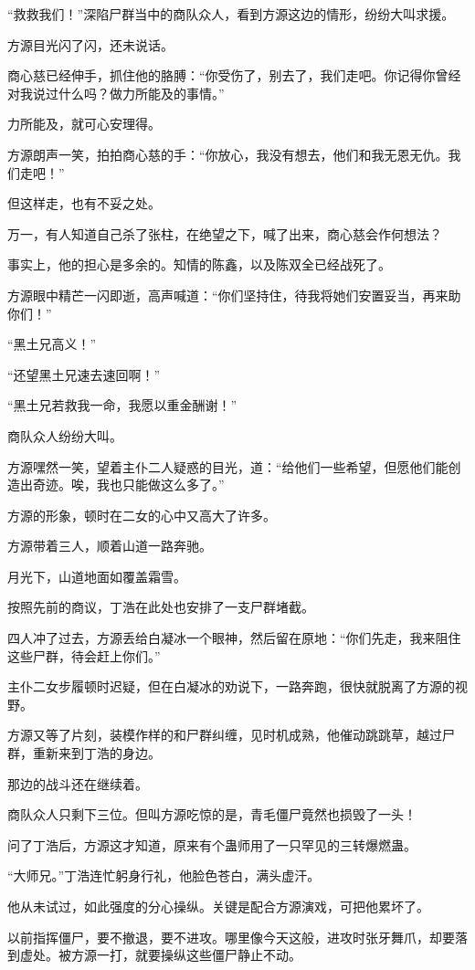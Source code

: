 \begin{this_body}
“救救我们！”深陷尸群当中的商队众人，看到方源这边的情形，纷纷大叫求援。

方源目光闪了闪，还未说话。

商心慈已经伸手，抓住他的胳膊：“你受伤了，别去了，我们走吧。你记得你曾经对我说过什么吗？做力所能及的事情。”

力所能及，就可心安理得。

方源朗声一笑，拍拍商心慈的手：“你放心，我没有想去，他们和我无恩无仇。我们走吧！”

但这样走，也有不妥之处。

万一，有人知道自己杀了张柱，在绝望之下，喊了出来，商心慈会作何想法？

事实上，他的担心是多余的。知情的陈鑫，以及陈双全已经战死了。

方源眼中精芒一闪即逝，高声喊道：“你们坚持住，待我将她们安置妥当，再来助你们！”

“黑土兄高义！”

“还望黑土兄速去速回啊！”

“黑土兄若救我一命，我愿以重金酬谢！”

商队众人纷纷大叫。

方源嘿然一笑，望着主仆二人疑惑的目光，道：“给他们一些希望，但愿他们能创造出奇迹。唉，我也只能做这么多了。”

方源的形象，顿时在二女的心中又高大了许多。

方源带着三人，顺着山道一路奔驰。

月光下，山道地面如覆盖霜雪。

按照先前的商议，丁浩在此处也安排了一支尸群堵截。

四人冲了过去，方源丢给白凝冰一个眼神，然后留在原地：“你们先走，我来阻住这些尸群，待会赶上你们。”

主仆二女步履顿时迟疑，但在白凝冰的劝说下，一路奔跑，很快就脱离了方源的视野。

方源又等了片刻，装模作样的和尸群纠缠，见时机成熟，他催动跳跳草，越过尸群，重新来到丁浩的身边。

那边的战斗还在继续着。

商队众人只剩下三位。但叫方源吃惊的是，青毛僵尸竟然也损毁了一头！

问了丁浩后，方源这才知道，原来有个蛊师用了一只罕见的三转爆燃蛊。

“大师兄。”丁浩连忙躬身行礼，他脸色苍白，满头虚汗。

他从未试过，如此强度的分心操纵。关键是配合方源演戏，可把他累坏了。

以前指挥僵尸，要不撤退，要不进攻。哪里像今天这般，进攻时张牙舞爪，却要落到虚处。被方源一打，就要操纵这些僵尸静止不动。


\end{this_body}
